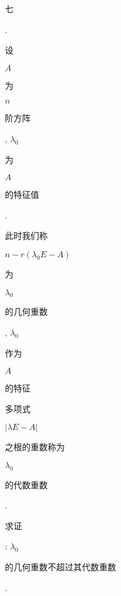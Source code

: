 \documentclass[10pt]{article}
\begin{document}
\begin{CJK}{UTF8}{mj}七\end{CJK}. \begin{CJK}{UTF8}{mj}设\end{CJK} $A$ \begin{CJK}{UTF8}{mj}为\end{CJK} $n$ \begin{CJK}{UTF8}{mj}阶方阵\end{CJK}, $\lambda_{0}$ \begin{CJK}{UTF8}{mj}为\end{CJK} $A$ \begin{CJK}{UTF8}{mj}的特征值\end{CJK}. \begin{CJK}{UTF8}{mj}此时我们称\end{CJK} $n-r\left(\lambda_{0} E-A\right)$ \begin{CJK}{UTF8}{mj}为\end{CJK} $\lambda_{0}$ \begin{CJK}{UTF8}{mj}的几何重数\end{CJK}, $\lambda_{0}$ \begin{CJK}{UTF8}{mj}作为\end{CJK} $A$ \begin{CJK}{UTF8}{mj}的特征\end{CJK} \begin{CJK}{UTF8}{mj}多项式\end{CJK} $|\lambda E-A|$ \begin{CJK}{UTF8}{mj}之根的重数称为\end{CJK} $\lambda_{0}$ \begin{CJK}{UTF8}{mj}的代数重数\end{CJK}. \begin{CJK}{UTF8}{mj}求证\end{CJK}: $\lambda_{0}$ \begin{CJK}{UTF8}{mj}的几何重数不超过其代数重数\end{CJK}.
\end{document}
